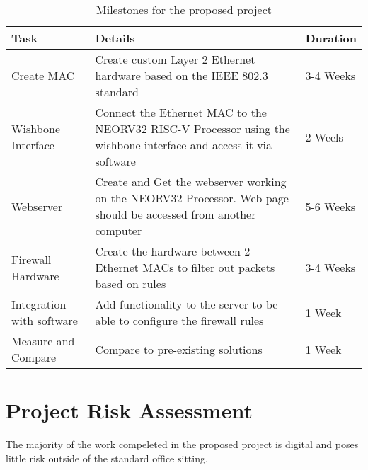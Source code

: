 \begin{table}[hbt!]
\centering%
    \begin{tabularx}{\textwidth}{ lXl }
        \hline
        Task                            & Details & Duration  \\ \hline
        Create MAC                      &  Create custom Layer 2 Ethernet hardware based on the IEEE 802.3 standard      & 3-4 Weeks \\
        Wishbone Interface              &  Connect the Ethernet MAC to the NEORV32 RISC-V Processor using the wishbone interface and access it via software       & 2 Weels   \\
        Webserver                       &  Create and Get the webserver working on the NEORV32 Processor. Web page should be accessed from another computer       & 5-6 Weeks \\ 
        Firewall Hardware               &  Create the hardware between 2 Ethernet MACs to filter out packets based on rules      & 3-4 Weeks \\ 
        Integration with software       &  Add functionality to the server to be able to configure the firewall rules       & 1 Week \\ 
        Measure and Compare             &  Compare to pre-existing solutions       & 1 Week \\ 
        \hline
        \end{tabularx}
\caption{ Milestones for the proposed project}\label{table:milestones}
\end{table}
 

\section{Project Risk Assessment}

The majority of the work compeleted in the proposed project is digital and poses little risk outside of the standard office sitting. 

